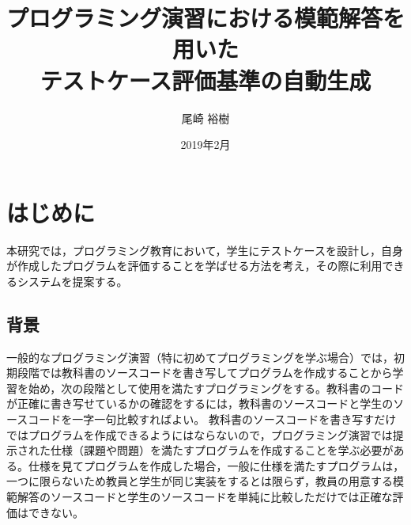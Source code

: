 \documentclass{tpu-sotu}
\author{尾崎 裕樹}
\title{プログラミング演習における模範解答を用いた\\テストケース評価基準の自動生成}
\date{2019年2月}
\begin{document}
%
\maketitle
\clearpage
{}
\tableofcontents
\clearpage
{}
%

%
\chapter{はじめに}
本研究では，プログラミング教育において，学生にテストケースを設計し，自身が作成したプログラムを評価することを学ばせる方法を考え，その際に利用できるシステムを提案する。
\section{背景}
一般的なプログラミング演習（特に初めてプログラミングを学ぶ場合）では，初期段階では教科書のソースコードを書き写してプログラムを作成することから学習を始め，次の段階として使用を満たすプログラミングをする。教科書のコードが正確に書き写せているかの確認をするには，教科書のソースコードと学生のソースコードを一字一句比較すればよい。
教科書のソースコードを書き写すだけではプログラムを作成できるようにはならないので，プログラミング演習では提示された仕様（課題や問題）を満たすプログラムを作成することを学ぶ必要がある。仕様を見てプログラムを作成した場合，一般に仕様を満たすプログラムは，一つに限らないため教員と学生が同じ実装をするとは限らず，教員の用意する模範解答のソースコードと学生のソースコードを単純に比較しただけでは正確な評価はできない。
\end{document}
